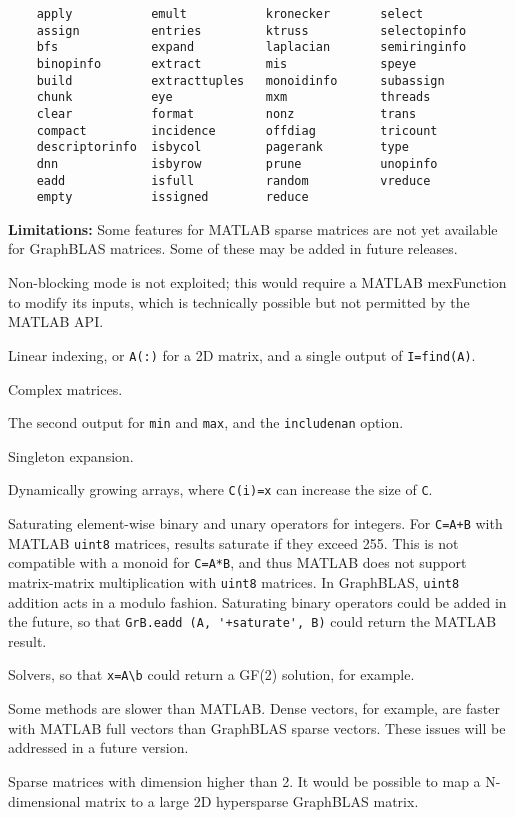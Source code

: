 \documentclass[12pt]{article}
\newenvironment{packed_itemize}{
\begin{itemize}
  \setlength{\itemsep}{1pt}
  \setlength{\parskip}{0pt}
  \setlength{\parsep}{0pt}
}{\end{itemize}}
\begin{document}
{\footnotesize
\begin{verbatim}
    apply           emult           kronecker       select          
    assign          entries         ktruss          selectopinfo    
    bfs             expand          laplacian       semiringinfo    
    binopinfo       extract         mis             speye           
    build           extracttuples   monoidinfo      subassign       
    chunk           eye             mxm             threads         
    clear           format          nonz            trans           
    compact         incidence       offdiag         tricount        
    descriptorinfo  isbycol         pagerank        type            
    dnn             isbyrow         prune           unopinfo        
    eadd            isfull          random          vreduce         
    empty           issigned        reduce  \end{verbatim}}

{\bf Limitations:}
Some features for MATLAB sparse matrices are not yet available for
GraphBLAS matrices.  Some of these may be added in future releases.

\begin{packed_itemize}
    \item Non-blocking mode is not exploited; this would require
        a MATLAB mexFunction to modify its inputs, which is
        technically possible but not permitted by the MATLAB API.
    \item Linear indexing, or \verb'A(:)' for a 2D matrix, and
        a single output of \verb'I=find(A)'.
    \item Complex matrices.
    \item The second output for \verb'min' and \verb'max',
        and the \verb'includenan' option.
    \item Singleton expansion.
    \item Dynamically growing arrays, where \verb'C(i)=x' can increase
        the size of \verb'C'.
    \item Saturating element-wise binary and unary operators for integers.
        For \verb'C=A+B' with MATLAB \verb'uint8' matrices, results
        saturate if they exceed 255.  This is not compatible with
        a monoid for \verb'C=A*B', and thus MATLAB does not support
        matrix-matrix multiplication with \verb'uint8' matrices.
        In GraphBLAS, \verb'uint8' addition acts in a modulo fashion.
        Saturating binary operators could be added in the future,
        so that \verb"GrB.eadd (A, '+saturate', B)" could return the
        MATLAB result.
    \item Solvers, so that \verb'x=A\b' could return a GF(2) solution,
        for example.
    \item Some methods are slower than MATLAB.  Dense vectors, for example,
        are faster with MATLAB full vectors than GraphBLAS sparse vectors.
        These issues will be addressed in a future version.
    \item Sparse matrices with dimension higher than 2.  It would be
        possible to map a N-dimensional matrix to a large 2D
        hypersparse GraphBLAS matrix.
\end{packed_itemize}
\end{document}
